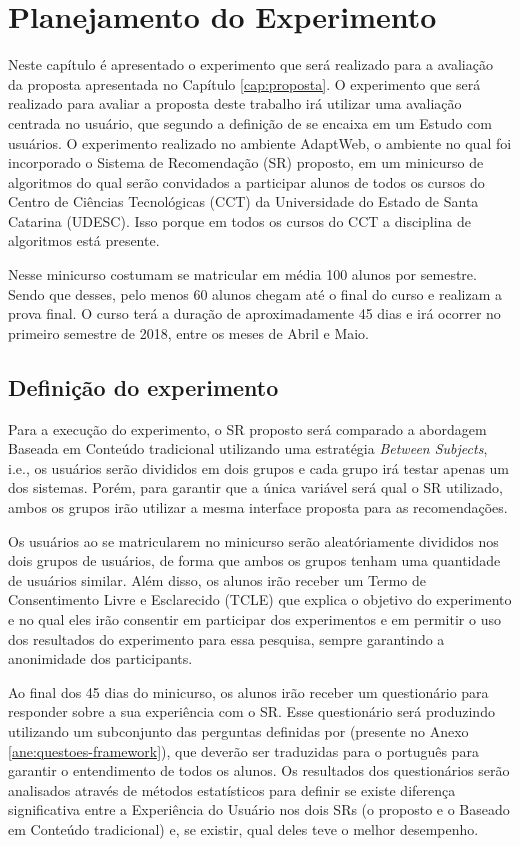 \chapter{Planejamento do Experimento}

Neste capítulo é apresentado o experimento que será realizado para a avaliação da proposta apresentada no Capítulo \ref{cap:proposta}.
O experimento que será realizado para avaliar a proposta deste trabalho irá utilizar uma avaliação centrada no usuário,
que segundo a definição de  se encaixa em um Estudo com usuários. O experimento realizado
no ambiente AdaptWeb\textsuperscript{\textregistered}, o ambiente no qual foi incorporado o Sistema de Recomendação (SR)
proposto, em um minicurso de algoritmos do qual serão convidados a participar alunos de todos os cursos do Centro de
Ciências Tecnológicas (CCT) da Universidade do Estado de Santa Catarina (UDESC). Isso porque em todos os cursos do CCT
a disciplina de algoritmos está presente.

Nesse minicurso costumam se matricular em média 100 alunos por semestre. Sendo que desses, pelo menos 60 alunos chegam até
o final do curso e realizam a prova final. O curso terá a duração de aproximadamente 45 dias e irá ocorrer no primeiro semestre
de 2018, entre os meses de Abril e Maio.

\section{Definição do experimento}

Para a execução do experimento, o SR proposto será comparado a abordagem Baseada em Conteúdo tradicional utilizando uma
estratégia \textit{Between Subjects}, i.e., os usuários serão divididos em dois grupos e cada grupo irá testar apenas
um dos sistemas. Porém, para garantir que a única variável será qual o SR utilizado, ambos os grupos irão utilizar a mesma
interface proposta para as recomendações.

Os usuários ao se matricularem no minicurso serão aleatóriamente divididos nos dois grupos de usuários, de forma que ambos
os grupos tenham uma quantidade de usuários similar. Além disso, os alunos irão receber um Termo de Consentimento Livre
e Esclarecido (TCLE) que explica o objetivo do experimento e no qual eles irão consentir em participar dos experimentos e
em permitir o uso dos resultados do experimento para essa pesquisa, sempre garantindo a anonimidade dos participants.

Ao final dos 45 dias do minicurso, os alunos irão receber um questionário para responder sobre a sua experiência com o SR.
Esse questionário será produzindo utilizando um subconjunto das perguntas definidas por  (presente no
Anexo \ref{ane:questoes-framework}), que deverão ser traduzidas para o português para garantir o entendimento de todos os alunos.
Os resultados dos questionários serão  analisados através de métodos estatísticos para definir se existe diferença
significativa entre a Experiência do Usuário nos dois SRs (o proposto e o Baseado em Conteúdo tradicional) e, se existir,
qual deles teve o melhor desempenho.

